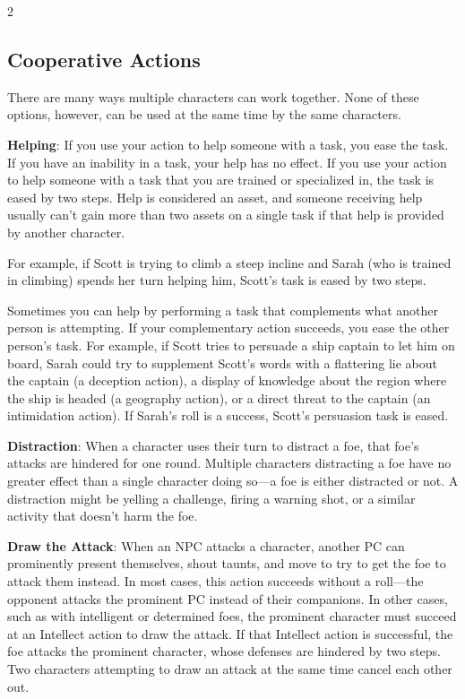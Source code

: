 \begin{multicols}{2}

\subsection{Cooperative Actions}

There are many ways multiple characters can work together. None of these options, however, can be used at the same time by the same characters.

\textbf{Helping}: If you use your action to help someone with a task, you ease the task. If you have an inability in a task, your help has no effect. If you use your action to help someone with a task that you are trained or specialized in, the task is eased by two steps. Help is considered an asset, and someone receiving help usually can’t gain more than two assets on a single task if that help is provided by another character.

For example, if Scott is trying to climb a steep incline and Sarah (who is trained in climbing) spends her turn helping him, Scott’s task is eased by two steps.

Sometimes you can help by performing a task that complements what another person is attempting. If your complementary action succeeds, you ease the other person’s task. For example, if Scott tries to persuade a ship captain to let him on board, Sarah could try to supplement Scott’s words with a flattering lie about the captain (a deception action), a display of knowledge about the region where the ship is headed (a geography action), or a direct threat to the captain (an intimidation action). If Sarah’s roll is a success, Scott’s persuasion task is eased.

\textbf{Distraction}: When a character uses their turn to distract a foe, that foe’s attacks are hindered for one round. Multiple characters distracting a foe have no greater effect than a single character doing so—a foe is either distracted or not. A distraction might be yelling a challenge, firing a warning shot, or a similar activity that doesn’t harm the foe.

\textbf{Draw the Attack}: When an NPC attacks a character, another PC can prominently present themselves, shout taunts, and move to try to get the foe to attack them instead. In most cases, this action succeeds without a roll—the opponent attacks the prominent PC instead of their companions. In other cases, such as with intelligent or determined foes, the prominent character must succeed at an Intellect action to draw the attack. If that Intellect action is successful, the foe attacks the prominent character, whose defenses are hindered by two steps. Two characters attempting to draw an attack at the same time cancel each other out.


\end{multicols}
